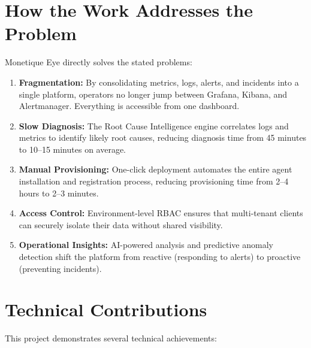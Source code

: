 \documentclass[12pt,a4paper]{report}
\begin{document}
\section*{How the Work Addresses the Problem}

Monetique Eye directly solves the stated problems:

\begin{enumerate}
  \item \textbf{Fragmentation:} By consolidating metrics, logs, alerts, and incidents into a single platform, operators no longer jump between Grafana, Kibana, and Alertmanager. Everything is accessible from one dashboard.
  
  \item \textbf{Slow Diagnosis:} The Root Cause Intelligence engine correlates logs and metrics to identify likely root causes, reducing diagnosis time from 45 minutes to 10–15 minutes on average.
  
  \item \textbf{Manual Provisioning:} One-click deployment automates the entire agent installation and registration process, reducing provisioning time from 2–4 hours to 2–3 minutes.
  
  \item \textbf{Access Control:} Environment-level RBAC ensures that multi-tenant clients can securely isolate their data without shared visibility.
  
  \item \textbf{Operational Insights:} AI-powered analysis and predictive anomaly detection shift the platform from reactive (responding to alerts) to proactive (preventing incidents).
\end{enumerate}

\section*{Technical Contributions}

This project demonstrates several technical achievements:
\end{document}
